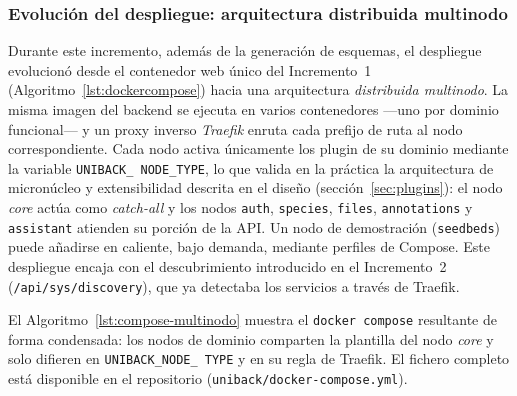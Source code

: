 \subsubsection{Evolución del despliegue: arquitectura distribuida multinodo}
Durante este incremento, además de la generación de esquemas, el despliegue
evolucionó desde el contenedor web único del Incremento~1
(Algoritmo~\ref{lst:dockercompose}) hacia una arquitectura \emph{distribuida
multinodo}. La misma imagen del backend se ejecuta en varios contenedores
---uno por dominio funcional--- y un proxy inverso \emph{Traefik} enruta cada
prefijo de ruta al nodo correspondiente. Cada nodo activa únicamente los
\gls{plugin} de su dominio mediante la variable \texttt{UNIBACK\_\allowbreak
NODE\_\allowbreak TYPE}, lo que valida en la práctica la arquitectura de
micronúcleo y extensibilidad descrita en el diseño (sección~\ref{sec:plugins}):
el nodo \emph{core} actúa como \emph{catch-all} y los nodos \texttt{auth},
\texttt{species}, \texttt{files}, \texttt{annotations} y \texttt{assistant}
atienden su porción de la API. Un nodo de demostración (\texttt{seedbeds})
puede añadirse en caliente, bajo demanda, mediante perfiles de Compose. Este
despliegue encaja con el descubrimiento introducido en el Incremento~2
(\texttt{/api/\allowbreak sys/\allowbreak discovery}), que ya detectaba los
servicios a través de Traefik.

El Algoritmo~\ref{lst:compose-multinodo} muestra el \texttt{docker compose}
resultante de forma condensada: los nodos de dominio comparten la plantilla del
nodo \emph{core} y solo difieren en \texttt{UNIBACK\_\allowbreak NODE\_\allowbreak
TYPE} y en su regla de Traefik. El fichero completo está disponible en el
repositorio (\texttt{uniback/\allowbreak docker-\allowbreak compose.\allowbreak yml}).

